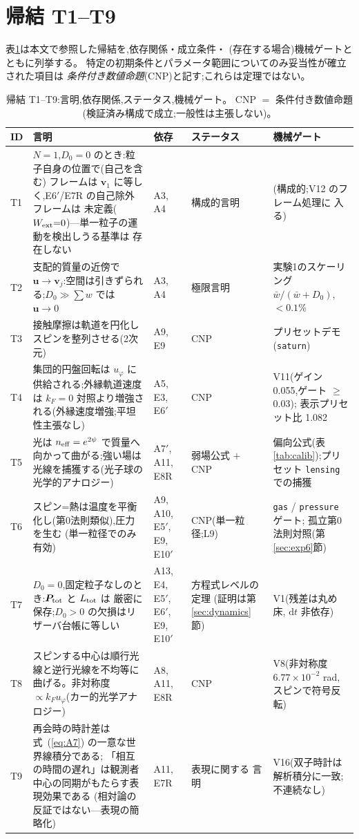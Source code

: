 \documentclass[a4paper,10pt,twocolumn]{ltjsarticle}
\newcommand{\ud}{\mathrm{d}}
\newcommand{\vect}[1]{\bm{#1}}
\newcommand{\Dz}{D_0}
\begin{document}
\section{帰結 T1--T9}
\label{app:theorems}

表\ref{tab:theorems}は本文で参照した帰結を,依存関係・成立条件・
(存在する場合)機械ゲートとともに列挙する。
特定の初期条件とパラメータ範囲についてのみ妥当性が確立された項目は
\emph{条件付き数値命題}(CNP)と記す;これらは定理ではない。

\begin{table}[t]
\caption{\label{tab:theorems}%
帰結 T1--T9:言明,依存関係,ステータス,機械ゲート。
CNP $=$ 条件付き数値命題(検証済み構成で成立;一般性は主張しない)。}
\centering
\small
\begin{tabular}{lp{}p{}p{}p{}}
\toprule
ID & 言明 & 依存 & ステータス & 機械ゲート \\
\midrule
T1 & $N{=}1$,$\Dz{=}0$ のとき:粒子自身の位置で(自己を含む)
フレームは $\vect{v}_1$ に等しく,E6$'$/E7R の自己除外フレームは
未定義($W_{\rm ext}{=}0$)---単一粒子の運動を検出しうる基準は
存在しない & A3, A4 & 構成的言明 & (構成的;V12 のフレーム処理に
入る) \\
T2 & 支配的質量の近傍で $\vect{u} \to \vect{v}_j$:空間は引きずられ
る;$\Dz \gg \sum w$ では $\vect{u} \to 0$ & A3, A4 & 極限言明 &
実験1のスケーリング $\bar w/(\bar w{+}\Dz)$,$<0.1\%$ \\
T3 & 接触摩擦は軌道を円化しスピンを整列させる(2次元) &
A9, E9 & CNP & プリセットデモ(\texttt{saturn}) \\
T4 & 集団的円盤回転は $u_\varphi$ に供給される;外縁軌道速度は
$k_F{=}0$ 対照より増強される(外縁速度増強;平坦性主張なし) &
A5, E3, E6$'$ & CNP & V11(ゲイン 0.055,ゲート $\ge$0.03);
表示プリセット比 1.082 \\
T5 & 光は $n_{\rm eff} = e^{2\psi}$ で質量へ向かって曲がる;強い場は
光線を捕獲する(光子球の光学的アナロジー) & A7$'$, A11, E8R &
弱場公式 $+$ CNP & 偏向公式(表\ref{tab:calib});プリセット
\texttt{lensing} での捕獲 \\
T6 & スピン=熱は温度を平衡化し(第0法則類似),圧力を生む
(単一粒径でのみ有効) & A9, A10, E5$'$, E9, E10$'$ &
CNP(単一粒径;L9) & \texttt{gas} / \texttt{pressure} ゲート;
孤立第0法則対照(第\ref{sec:exp6}節) \\
T7 & $\Dz{=}0$,固定粒子なしのとき:$\vect{P}_{\rm tot}$ と $L_{\rm tot}$ は
厳密に保存;$\Dz{>}0$ の欠損はリザーバ台帳に等しい & A13, E4,
E5$'$, E6$'$, E9, E10$'$ & 方程式レベルの定理
(証明は第\ref{sec:dynamics}節) & V1(残差は丸め床,
$\ud t$ 非依存) \\
T8 & スピンする中心は順行光線と逆行光線を不均等に曲げる。非対称度
$\propto k_F u_\varphi$(カー的光学アナロジー) & A8, A11, E8R &
CNP & V8(非対称度 $6.77\times10^{-2}$ rad,スピンで符号反転) \\
T9 & 再会時の時計差は式~(\ref{eq:A7}) の一意な世界線積分である;
「相互の時間の遅れ」は観測者中心の同期がもたらす表現効果である
(相対論の反証ではない---表現の簡略化) & A11, E7R & 表現に関する
言明 & V16(双子時計は解析積分に一致;不連続なし) \\
\bottomrule
\end{tabular}
\end{table}
\end{document}
